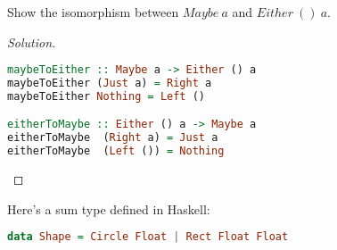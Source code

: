 \documentclass[7x10,thmnumcontwithchapter,WebLink,AddlevelTwoTOC,NumRef,BookEndNote,printer]{pupbook}
\begin{document}
\begin{exercise}
Show the isomorphism between $Maybe \ a$ and $Either \ () \ a$.
\end{exercise}

\begin{proof}[Solution]
~\\	
\begin{lstlisting}[language=Haskell]
maybeToEither :: Maybe a -> Either () a
maybeToEither (Just a) = Right a
maybeToEither Nothing = Left ()

eitherToMaybe :: Either () a -> Maybe a
eitherToMaybe  (Right a) = Just a
eitherToMaybe  (Left ()) = Nothing
\end{lstlisting}
\end{proof}


\begin{exercise}
Here’s a sum type defined in Haskell: 
\begin{lstlisting}[language=Haskell]
data Shape = Circle Float | Rect Float Float
\end{lstlisting}

\end{exercise}
\end{document}
